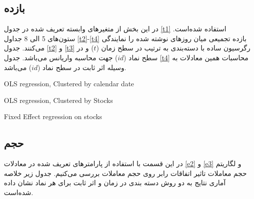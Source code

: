 \documentclass[12pt]{article}
\begin{document}
\subsection{بازده}
در این بخش از متغیر‌های وابسته تعریف شده در جدول 
\ref{t1}
استفاده شده‌است. ستون‌های 5 الی 8 جداول 
\ref{t2}-\ref{t4}
بازده تجمیعی میان روز‌های نوشته شده را نمایندگی می‌کنند. جدول 
\ref{t2}
و
\ref{t3}
رگرسیون ساده با دسته‌بندی به ترتیب در سطح زمان ($ t $) و در سطح نماد ($ id $) جهت محاسبه واریانس می‌باشد. جدول 
 \ref{t4}
 محاسبات همین معادلات به وسیله اثر ثابت در سطح نماد ($ id $) می‌باشد.




\begin{LTR}
\begin{landscape}
\begin{table}[htbp]
\centering

\caption{OLS regression, Clustered by calendar date}
\label{t2}
\end{table}
\begin{table}[htbp]
\centering

\caption{OLS regression, Clustered by Stocks}
\label{t3}
\end{table}
\end{landscape}
\begin{landscape}
\begin{table}[htbp]
\centering

\caption{Fixed Effect regression on stocks}
\label{t4}
\end{table}
\end{landscape}
\end{LTR}


\restoregeometry
\subsection{حجم}

در این قسمت با استفاده از پارامتر‌های تعریف شده در معادلات 
\ref{e2} 
و
\ref{e3}
 و لگاریتم حجم معاملات تاثیر اتفاقات رابر روی حجم معاملات بررسی می‌کنیم. جدول زیر خلاصه آماری نتایج به دو روش دسته بندی در زمان و اثر ثابت برای هر نماد نشان داده شده‌است.


\begin{LTR}
%
\lr{\begin{table}[htbp]
\centering

\label{t6}
\end{table}}

\end{LTR}
\FloatBarrier
\end{document}
